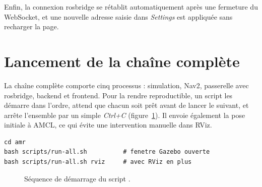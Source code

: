 Enfin, la connexion rosbridge se rétablit automatiquement après une fermeture du
WebSocket, et une nouvelle adresse saisie dans \emph{Settings} est appliquée sans
recharger la page.

\section{Lancement de la chaîne complète}
La chaîne complète comporte cinq processus : simulation, Nav2, passerelle avec rosbridge,
backend et frontend. Pour la rendre reproductible, un script  les
démarre dans l'ordre, attend que chacun soit prêt avant de lancer le suivant, et arrête
l'ensemble par un simple \emph{Ctrl+C} (figure~\ref{fig:lancement}). Il envoie également la
pose initiale à AMCL, ce qui évite une intervention manuelle dans RViz.

\begin{lstlisting}
cd amr
bash scripts/run-all.sh          # fenetre Gazebo ouverte
bash scripts/run-all.sh rviz     # avec RViz en plus
\end{lstlisting}

\begin{figure}[htbp]
\centering
{}
\caption{Séquence de démarrage du script .}
\label{fig:lancement}
\end{figure}

